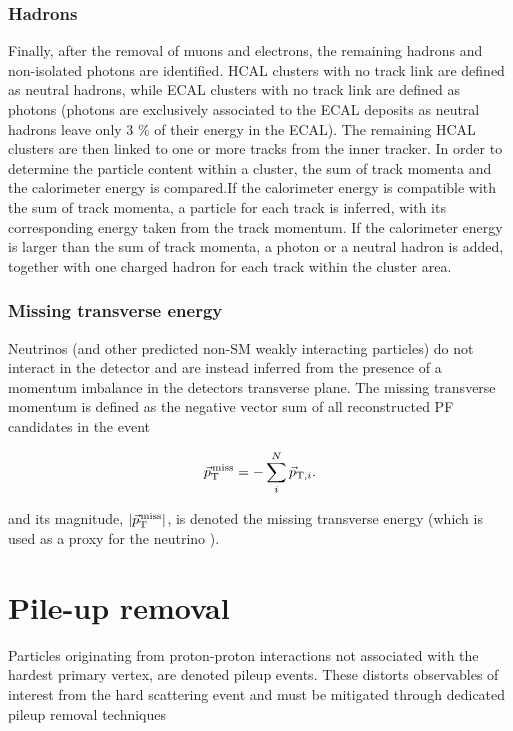 \subsubsection{Hadrons}
Finally, after the removal of muons and electrons, the remaining hadrons and non-isolated photons are identified. HCAL clusters with no track link are defined as neutral hadrons, while ECAL clusters with no track link are defined as photons (photons are exclusively associated to the ECAL deposits as neutral hadrons leave only 3 \% of their energy in the ECAL).
The remaining HCAL clusters are then linked to one or more tracks from the inner tracker. In order to determine the particle content within a cluster, the sum of track momenta and the calorimeter energy is compared.If the calorimeter energy is compatible with the sum of track momenta, a particle for each track is inferred, with its corresponding energy taken from the track momentum.  If the calorimeter energy is larger than the sum of track momenta, a photon or a neutral hadron is added, together with one charged hadron for each track within the cluster area.

\subsubsection{Missing transverse energy}
Neutrinos (and other predicted non-SM weakly interacting particles) do not interact in the detector and are instead inferred from the presence of a momentum imbalance in the detectors transverse plane. The missing transverse momentum is defined as the negative \PT vector sum of all reconstructed PF candidates in the event

\begin{equation}
{\vec p}_{\mathrm{T}}^{\kern1pt\text{miss}} = -\sum_{i}^{N}{\vec p}_{\mathrm{T},i}.
\end{equation}

and its magnitude, $|{\vec p}_{\mathrm{T}}^{\kern1pt\text{miss}}|$, is denoted the missing transverse energy \ETmiss (which is used as a proxy for the neutrino \PT).
 
\section{Pile-up removal}

Particles originating from proton-proton interactions not associated with the hardest primary vertex, are denoted pileup events.
These distorts observables of interest from the hard scattering event and must be mitigated through dedicated pileup removal techniques


